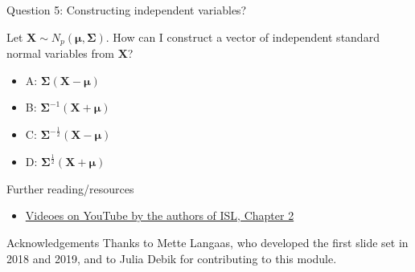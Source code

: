 \documentclass[
  ignorenonframetext,
]{beamer}
\providecommand{\tightlist}{%
  \setlength{\itemsep}{0pt}\setlength{\parskip}{0pt}}
\begin{document}
\begin{frame}
\begin{block}{Question 5: Constructing independent variables?}
\protect\hypertarget{question-5-constructing-independent-variables}{}
\vspace{2mm}

Let \(\boldsymbol{X}\sim N_p(\boldsymbol{\mu},\boldsymbol\Sigma)\). How
can I construct a vector of independent standard normal variables from
\(\boldsymbol{X}\)?

\vspace{2mm}

\begin{itemize}
\tightlist
\item
  A: \(\boldsymbol\Sigma(\boldsymbol{X}-\boldsymbol{\mu})\)
\item
  B: \(\boldsymbol\Sigma^{-1}(\boldsymbol{X}+\boldsymbol{\mu})\)
\item
  C:
  \(\boldsymbol\Sigma^{-\frac{1}{2}}(\boldsymbol{X}-\boldsymbol{\mu})\)
\item
  D:
  \(\boldsymbol\Sigma^{\frac{1}{2}}(\boldsymbol{X}+\boldsymbol{\mu})\)
\end{itemize}
\end{block}
\end{frame}

\begin{frame}
\end{frame}

\begin{frame}{ Further reading/resources}
\protect\hypertarget{further-readingresources}{}
\begin{itemize}
\tightlist
\item
  \href{https://www.youtube.com/playlist?list=PL5-da3qGB5IDvuFPNoSqheihPOQNJpzyy}{Videoes
  on YouTube by the authors of ISL, Chapter 2}
\end{itemize}
\end{frame}

\begin{frame}{Acknowledgements}
\protect\hypertarget{acknowledgements}{}
Thanks to Mette Langaas, who developed the first slide set in 2018 and
2019, and to Julia Debik for contributing to this module.
\end{frame}
\end{document}
